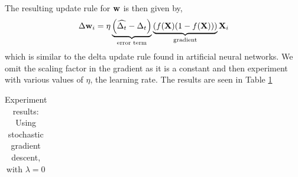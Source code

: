 \documentclass[12 pt]{article}
\begin{document}
The resulting update rule for $\mathbf{w}$ is then given by,
\[
	\Delta \mathbf{w}_i = \eta
				\underbrace{\left(\widehat{\Delta_t} - \Delta_t \right)}_{\text{error term}}
				\underbrace{\left( f(\mathbf{X})(1-f(\mathbf{X})) \right)}_{\text{gradient}}
						\mathbf{X}_i
\]
which is similar to the delta update rule found in artificial neural networks. We omit the scaling factor in the gradient as it is a constant and then experiment with various values of $\eta$, the learning rate. The results are seen in Table \ref{sig_grad_desc}
\begin{table}
	\footnotesize
	\begin{centering}
	\begin{tabular}{|l|c|c|c|c|c|c|c|c|}
	\hline
	
	\hline
	\end{tabular}
	\caption{Experiment results: Using stochastic gradient descent, with $\lambda = 0$}
	\label{sig_grad_desc}
\end{centering}
\end{table}



\end{document}
